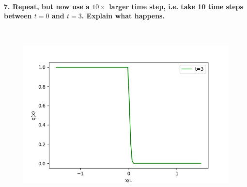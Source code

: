 \paragraph{7. Repeat, but now use a $10\times$ larger time 
    step, i.e. take 10 time steps between $t=0$ and $t=3$. 
    Explain what happens.
} \ \\
    \begin{figure}[h!]
        \centering
        \includegraphics[width=.6\textwidth]{../figures/upwind_7.png}
        \caption{}
    \end{figure} \ \\ 

